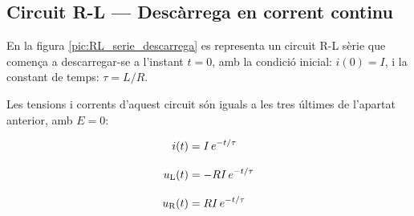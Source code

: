 \subsection{Circuit R-L --- Descàrrega en corrent continu}\label{sec:RL-descarrega}

En la figura \vref{pic:RL_serie_descarrega} es representa un circuit R-L sèrie que comença a descarregar-se a l'instant $t=0$, amb la condició inicial: $i(0) = I$, i la constant de temps: $\tau = L/R$.
\begin{center}
    
    \label{pic:RL_serie_descarrega}
\end{center}


Les tensions i corrents d'aquest circuit són iguals a les tres últimes de l'apartat anterior, amb $E=0$:

\hfill
\begin{minipage}[b]{9cm}
    
\end{minipage}
\hfill
\begin{minipage}[b]{6cm}
    \begin{align}
        i(t) &= I\,e^{-t/\tau} \label{eq:RL-i-descarrega}\\[3mm]
        u_\mathrm{L}(t) &= - R I\,e^{-t/\tau}\label{eq:RL-ul-descarrega} \\[3mm]
        u_\mathrm{R}(t) &= R I\,e^{-t/\tau}
    \end{align}
\end{minipage}



